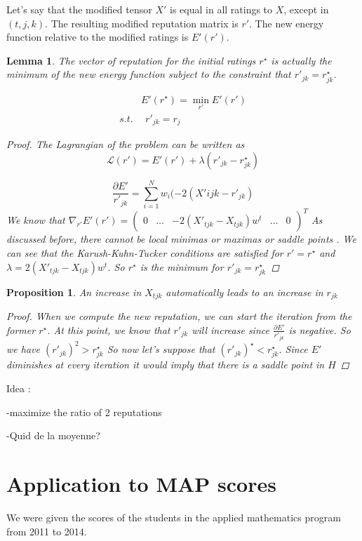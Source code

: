 \documentclass[12pt,a4paper]{article}
\newtheorem{lemma}{Lemma}
\newtheorem{proposition}{Proposition}
\begin{document}
Let's say that the modified tensor $X'$ is equal in all ratings to $X$, except in $(t,j,k)$. The resulting modified reputation matrix is $r'$. The new energy function relative to the modified ratings is $E'(r')$.
\begin{lemma}
The vector of reputation for the initial ratings $r^{\star}$ is actually the minimum of the new energy function subject to the constraint that $r'_{jk}=r^{\star}_{jk}$.

\begin{align*} 
 & E'(r^{\star}) = \min_{r'} E'(r')\\
s.t.  & \:\: r'_{jk} = r_j
\end{align*}

\begin{proof}
The Lagrangian of the problem can be written as
$$\mathcal{L}(r') = E'(r') + \lambda (r'_{jk} - r_{jk}^{\star})$$

$$\frac{\partial E'}{r'_{jk}} = \sum_{i=1}^N w_i (-2 (X'{ijk}-r'_{jk})$$
We know that $\nabla_{r'}E'(r') = \begin{pmatrix} 0 & \hdots & -2 (X'_{tjk}-X_{tjk})w^t & \hdots & 0\end{pmatrix}^T$
As discussed before, there cannot be local minimas or maximas or saddle points .
We can see that the Karush-Kuhn-Tucker conditions are satisfied for $r' = r^{\star}$ and $\lambda = 2 (X'_{tjk}-X_{tjk})w^t$. So $r^{\star}$ is the minimum for $r'_{jk} = r^{\star}_{jk}$
\end{proof}
\end{lemma}


\begin{proposition}
An increase in $X_{tjk}$ automatically leads to an increase in $r_{jk}$
\begin{proof}
When we compute the new reputation, we can start the iteration from the former $r^{\star}$. At this point, we know that $r'_{jk}$ will increase since $\frac{\partial E'}{r'_{jk}} $ is negative. So we have $(r'_{jk})^2 > r^{\star}_{jk}$
So now let's suppose that $(r'_{jk})^{\star}< r^{\star}_{jk} $. Since $E'$ diminishes at every iteration it would imply that there is a saddle point in $H$
\end{proof}

\end{proposition}
Idea : 

-maximize the ratio of 2 reputations

-Quid de la moyenne?

\section*{Application to MAP scores}
We were given the scores of the students in the applied mathematics program from 2011 to 2014.
\FloatBarrier
\end{document}
